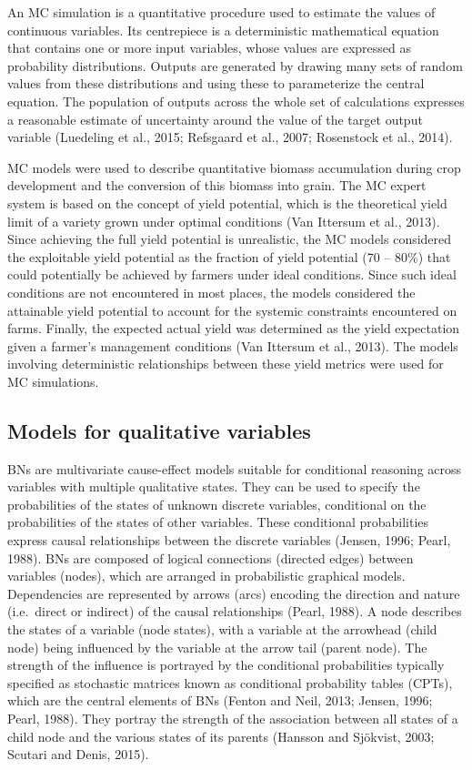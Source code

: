 \documentclass[]{elsarticle} %
\begin{document}
An MC simulation is a quantitative procedure used to estimate the values of continuous variables. Its centrepiece is a deterministic mathematical equation that contains one or more input variables, whose values are expressed as probability distributions. Outputs are generated by drawing many sets of random values from these distributions and using these to parameterize the central equation. The population of outputs across the whole set of calculations expresses a reasonable estimate of uncertainty around the value of the target output variable (Luedeling et al., 2015; Refsgaard et al., 2007; Rosenstock et al., 2014).

MC models were used to describe quantitative biomass accumulation during crop development and the conversion of this biomass into grain. The MC expert system is based on the concept of yield potential, which is the theoretical yield limit of a variety grown under optimal conditions (Van Ittersum et al., 2013). Since achieving the full yield potential is unrealistic, the MC models considered the exploitable yield potential as the fraction of yield potential (70 -- 80\%) that could potentially be achieved by farmers under ideal conditions. Since such ideal conditions are not encountered in most places, the models considered the attainable yield potential to account for the systemic constraints encountered on farms. Finally, the expected actual yield was determined as the yield expectation given a farmer's management conditions (Van Ittersum et al., 2013). The models involving deterministic relationships between these yield metrics were used for MC simulations.

\hypertarget{ref33}{%
\subsection{Models for qualitative variables}\label{ref33}}

BNs are multivariate cause-effect models suitable for conditional reasoning across variables with multiple qualitative states. They can be used to specify the probabilities of the states of unknown discrete variables, conditional on the probabilities of the states of other variables. These conditional probabilities express causal relationships between the discrete variables (Jensen, 1996; Pearl, 1988). BNs are composed of logical connections (directed edges) between variables (nodes), which are arranged in probabilistic graphical models. Dependencies are represented by arrows (arcs) encoding the direction and nature (i.e.~direct or indirect) of the causal relationships (Pearl, 1988). A node describes the states of a variable (node states), with a variable at the arrowhead (child node) being influenced by the variable at the arrow tail (parent node). The strength of the influence is portrayed by the conditional probabilities typically specified as stochastic matrices known as conditional probability tables (CPTs), which are the central elements of BNs (Fenton and Neil, 2013; Jensen, 1996; Pearl, 1988). They portray the strength of the association between all states of a child node and the various states of its parents (Hansson and Sjökvist, 2003; Scutari and Denis, 2015).
\end{document}
